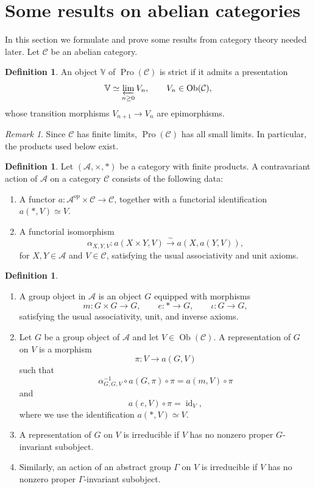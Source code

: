 \documentclass[11pt,a4paper,twoside]{amsart}
\theoremstyle{definition}
\newtheorem{definition}[theorem]{Definition}
\theoremstyle{remark}
\newtheorem{remark}[theorem]{Remark}
\newcommand{\mV}{\mathbb V}
\newcommand{\GG}{\Gamma}
\newcommand{\mcA}{\mathcal A}
\newcommand{\mcC}{\mathcal C}
\newcommand{\prl}{\varprojlim}
\newcommand{\sms}{\smallskip}
\newcommand{\Pro}{\operatorname{Pro}}
\begin{document}
\section{Some results on abelian categories}
In this section we formulate and prove some results from category theory needed later.
\sms
Let $\mcC$ be an abelian category.
\begin{definition}\label{strict}
An object $\mV$ of $\Pro(\mcC)$ is strict if it admits a presentation
$$
\mV\simeq\prl_{n\geq0}V_n,\qquad V_n\in\operatorname{Ob}(\mcC),
$$
whose transition morphisms $V_{n+1}\to V_n$ are epimorphisms.
\end{definition}
\begin{remark}
Since $\mcC$ has finite limits, $\Pro(\mcC)$ has all small limits. In particular, the products used below exist.
\end{remark}
\begin{definition}\label{basic}
Let $(\mcA,\times,*)$ be a category with finite products. A contravariant action of $\mcA$ on a category $\mcC$ consists of the following data:
\begin{enumerate}
\item A functor $a:\mcA^{op}\times\mcC\to\mcC$, together with a functorial identification $a(*,V)\simeq V$.
\item A functorial isomorphism
$$
\alpha_{X,Y,V}:a(X\times Y,V)\xrightarrow{\sim}a(X,a(Y,V)),
$$
for $X,Y\in\mcA$ and $V\in\mcC$, satisfying the usual associativity and unit axioms.
\end{enumerate}
\end{definition}
\begin{definition}
\begin{enumerate}
\item A group object in $\mcA$ is an object $G$ equipped with morphisms
$$
m:G\times G\to G,\qquad e:*\to G,\qquad \iota:G\to G,
$$
satisfying the usual associativity, unit, and inverse axioms.
\item Let $G$ be a group object of $\mcA$ and let $V\in\operatorname{Ob}(\mcC)$. A representation of $G$ on $V$ is a morphism
$$
\pi:V\to a(G,V)
$$
such that
$$
\alpha_{G,G,V}^{-1}\circ a(G,\pi)\circ\pi=a(m,V)\circ\pi
$$
and
$$
a(e,V)\circ\pi=\operatorname{id}_V,
$$
where we use the identification $a(*,V)\simeq V$.
\item A representation of $G$ on $V$ is irreducible if $V$ has no nonzero proper $G$-invariant subobject.
\item Similarly, an action of an abstract group $\GG$ on $V$ is irreducible if $V$ has no nonzero proper $\GG$-invariant subobject.
\end{enumerate}
\end{definition}
\end{document}
